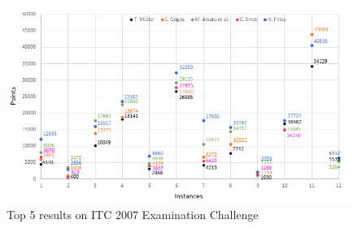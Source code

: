 \begin{figure}[h!]
 \centering
   \includegraphics[scale=1]{./images/presentation.png}
   \caption{Top 5 results on ITC 2007 Examination Challenge}
   \label{fig:Top5itc}
\end{figure}





